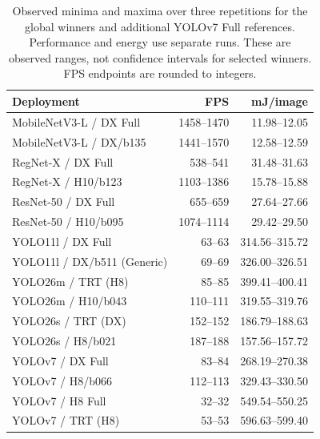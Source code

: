 \begin{table}[!htb]
\centering\small\setlength{\tabcolsep}{3pt}
\caption{Observed minima and maxima over three repetitions for the global winners and additional YOLOv7 Full references. Performance and energy use separate runs. These are observed ranges, not confidence intervals for selected winners. FPS endpoints are rounded to integers.}
\label{tab:evaluation:repeat_ranges}

\begin{tabular}{@{}lrr@{}}
\toprule
Deployment & FPS & mJ/image \\
\midrule
MobileNetV3-L / DX Full & 1458--1470 & 11.98--12.05 \\
MobileNetV3-L / DX/b135 & 1441--1570 & 12.58--12.59 \\
RegNet-X / DX Full & 538--541 & 31.48--31.63 \\
RegNet-X / H10/b123 & 1103--1386 & 15.78--15.88 \\
ResNet-50 / DX Full & 655--659 & 27.64--27.66 \\
ResNet-50 / H10/b095 & 1074--1114 & 29.42--29.50 \\
YOLO11l / DX Full & 63--63 & 314.56--315.72 \\
YOLO11l / DX/b511 (Generic) & 69--69 & 326.00--326.51 \\
YOLO26m / TRT (H8) & 85--85 & 399.41--400.41 \\
YOLO26m / H10/b043 & 110--111 & 319.55--319.76 \\
YOLO26s / TRT (DX) & 152--152 & 186.79--188.63 \\
YOLO26s / H8/b021 & 187--188 & 157.56--157.72 \\
YOLOv7 / DX Full & 83--84 & 268.19--270.38 \\
YOLOv7 / H8/b066 & 112--113 & 329.43--330.50 \\
YOLOv7 / H8 Full & 32--32 & 549.54--550.25 \\
YOLOv7 / TRT (H8) & 53--53 & 596.63--599.40 \\
\bottomrule
\end{tabular}
\end{table}
